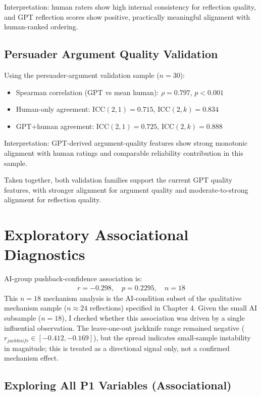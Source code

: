 Interpretation: human raters show high internal consistency for reflection quality,
and GPT reflection scores show positive, practically meaningful alignment with human-ranked ordering.

\subsection{Persuader Argument Quality Validation}

Using the persuader-argument validation sample ($n=30$):
\begin{itemize}
    \item Spearman correlation (GPT vs mean human): $\rho=0.797$, $p<0.001$
    \item Human-only agreement: ICC$(2,1)=0.715$, ICC$(2,k)=0.834$
    \item GPT+human agreement: ICC$(2,1)=0.725$, ICC$(2,k)=0.888$
\end{itemize}

Interpretation: GPT-derived argument-quality features show strong monotonic alignment
with human ratings and comparable reliability contribution in this sample.

Taken together, both validation families support the current GPT quality features,
with stronger alignment for argument quality and moderate-to-strong alignment for reflection quality.

\pagebreak
\section{Exploratory Associational Diagnostics}

AI-group pushback-confidence association is:
\begin{align}
r=-0.298, \quad p=0.2295, \quad n=18
\end{align}
This $n=18$ mechanism analysis is the AI-condition subset of the qualitative mechanism sample
($n \approx 24$ reflections) specified in Chapter 4.
Given the small AI subsample ($n=18$), I checked whether this association was driven by a single influential observation.
The leave-one-out jackknife range remained negative ($r_{jackknife} \in [-0.412,-0.169]$), but the spread indicates
small-sample instability in magnitude; this is treated as a directional signal only, not a confirmed mechanism effect.

\subsection{Exploring All P1 Variables (Associational)}

